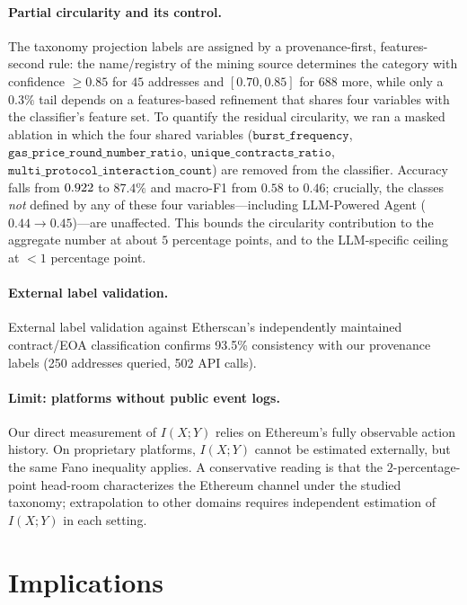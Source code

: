 \documentclass[11pt,a4paper]{article}
\begin{document}
\paragraph{Partial circularity and its control.} The taxonomy projection
labels are assigned by a provenance-first, features-second rule: the
name/registry of the mining source determines the category with
confidence $\geq 0.85$ for $45$ addresses and $[0.70, 0.85]$ for $688$
more, while only a $0.3\%$ tail depends on a features-based refinement
that shares four variables with the classifier's feature set. To quantify
the residual circularity, we ran a masked ablation in which the four
shared variables ($\texttt{burst\_frequency}$,
$\texttt{gas\_price\_round\_number\_ratio}$,
$\texttt{unique\_contracts\_ratio}$,
$\texttt{multi\_protocol\_interaction\_count}$) are removed from the
classifier. Accuracy falls from $0.922$ to $87.4\%$ and macro-F1 from
$0.58$ to $0.46$; crucially, the classes \emph{not} defined by any of
these four variables---including LLM-Powered Agent
($0.44 \to 0.45$)---are unaffected. This bounds the circularity
contribution to the aggregate number at about $5$ percentage points, and
to the LLM-specific ceiling at $<1$ percentage point.

\paragraph{External label validation.} External label validation against Etherscan's independently maintained contract/EOA classification confirms 93.5\% consistency with our provenance labels (250 addresses queried, 502 API calls).

\paragraph{Limit: platforms without public event logs.} Our direct
measurement of $I(X;Y)$ relies on Ethereum's fully observable action
history. On proprietary platforms, $I(X;Y)$ cannot be estimated externally,
but the same Fano inequality applies.
A conservative reading is that the
$2$-percentage-point head-room characterizes the Ethereum
channel under the studied taxonomy; extrapolation to other
domains requires independent estimation of $I(X;Y)$ in each setting.

\section*{Implications}
\end{document}
